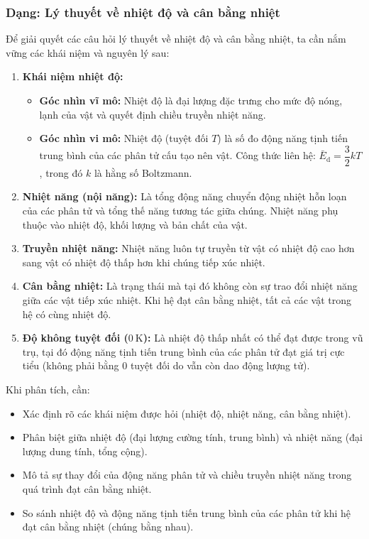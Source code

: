 \subsubsection{Dạng: Lý thuyết về nhiệt độ và cân bằng nhiệt}
\begin{phuongphap}
	Để giải quyết các câu hỏi lý thuyết về nhiệt độ và cân bằng nhiệt, ta cần nắm vững các khái niệm và nguyên lý sau:
	\begin{enumerate}
		\item \textbf{Khái niệm nhiệt độ:}
		\begin{itemize}
			\item \textbf{Góc nhìn vĩ mô:} Nhiệt độ là đại lượng đặc trưng cho mức độ nóng, lạnh của vật và quyết định chiều truyền nhiệt năng.
			\item \textbf{Góc nhìn vi mô:} Nhiệt độ (tuyệt đối $T$) là số đo động năng tịnh tiến trung bình của các phân tử cấu tạo nên vật. Công thức liên hệ: $\bar{E}_{\mathrm{d}} = \dfrac{3}{2} k T$, trong đó $k$ là hằng số Boltzmann.
		\end{itemize}
		\item \textbf{Nhiệt năng (nội năng):}
		Là tổng động năng chuyển động nhiệt hỗn loạn của các phân tử và tổng thế năng tương tác giữa chúng. Nhiệt năng phụ thuộc vào nhiệt độ, khối lượng và bản chất của vật.
		\item \textbf{Truyền nhiệt năng:}
		Nhiệt năng luôn tự truyền từ vật có nhiệt độ cao hơn sang vật có nhiệt độ thấp hơn khi chúng tiếp xúc nhiệt.
		\item \textbf{Cân bằng nhiệt:}
		Là trạng thái mà tại đó không còn sự trao đổi nhiệt năng giữa các vật tiếp xúc nhiệt. Khi hệ đạt cân bằng nhiệt, tất cả các vật trong hệ có cùng nhiệt độ.
		\item \textbf{Độ không tuyệt đối ($0\ \mathrm{K}$):}
		Là nhiệt độ thấp nhất có thể đạt được trong vũ trụ, tại đó động năng tịnh tiến trung bình của các phân tử đạt giá trị cực tiểu (không phải bằng 0 tuyệt đối do vẫn còn dao động lượng tử).
	\end{enumerate}
	Khi phân tích, cần:
	\begin{itemize}
		\item Xác định rõ các khái niệm được hỏi (nhiệt độ, nhiệt năng, cân bằng nhiệt).
		\item Phân biệt giữa nhiệt độ (đại lượng cường tính, trung bình) và nhiệt năng (đại lượng dung tính, tổng cộng).
		\item Mô tả sự thay đổi của động năng phân tử và chiều truyền nhiệt năng trong quá trình đạt cân bằng nhiệt.
		\item So sánh nhiệt độ và động năng tịnh tiến trung bình của các phân tử khi hệ đạt cân bằng nhiệt (chúng bằng nhau).
	\end{itemize}
\end{phuongphap}
